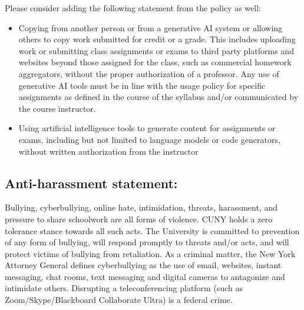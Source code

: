 \documentclass[a4paper]{article}
\begin{document}
Please consider adding the following statement  from the policy as well:
\begin{itemize}
    \item Copying from another person or from a generative AI system or allowing
    others to copy work submitted for credit or a grade. This includes uploading
    work or submitting class assignments or exams to third party platforms and
    websites beyond those assigned for the class, such as commercial homework
    aggregators, without the proper authorization of a professor. Any use of 
    generative AI tools must be in line with the usage policy for specific 
    assignments as defined in the course of the syllabus and/or communicated by
    the course instructor.
    \item Using artificial intelligence tools to generate content for assignments
    or exams, including but not limited to language models or code generators, 
    without written authorization from the instructor
\end{itemize}

\subsection{Anti-harassment statement:}
Bullying, cyberbullying, online hate, intimidation, threats, harassment, and 
pressure to share schoolwork are all forms of violence. CUNY holds a zero 
tolerance stance towards all such acts. The University is committed to prevention
of any form of bullying, will respond promptly to threats and/or acts, and will 
protect victims of bullying from retaliation. As a criminal matter, the New York
Attorney General defines cyberbullying as the use of email, websites, instant 
messaging, chat rooms, text messaging and digital cameras to antagonize and 
intimidate others. Disrupting a teleconferencing platform 
(such as Zoom/Skype/Blackboard Collaborate Ultra) is a federal crime.
\end{document}

